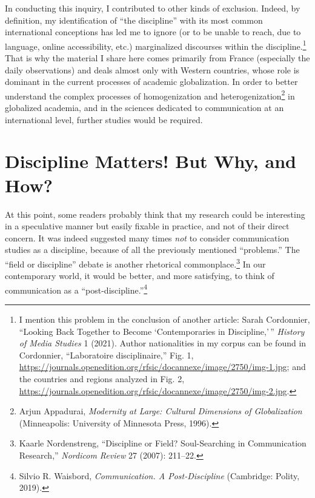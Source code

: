 \documentclass{tufte-handout}
\begin{document}
In conducting this inquiry, I contributed to other kinds of exclusion.
Indeed, by definition, my identification of ``the discipline'' with its
most common international conceptions has led me to ignore (or to be
unable to reach, due to language, online accessibility, etc.)
marginalized discourses within the discipline.\footnote{I mention this
  problem in the conclusion of another article: Sarah Cordonnier,
  ``Looking Back Together to Become `Contemporaries in Discipline,'\,''
  \emph{History of Media Studies} 1 (2021). Author nationalities in my
  corpus can be found in Cordonnier, ``Laboratoire disciplinaire,'' Fig.
  1,
  \url{https://journals.openedition.org/rfsic/docannexe/image/2750/img-1.jpg};
  and the countries and regions analyzed in Fig. 2,
  \url{https://journals.openedition.org/rfsic/docannexe/image/2750/img-2.jpg}.}
That is why the material I share here comes primarily from France
(especially the daily observations) and deals almost only with Western
countries, whose role is dominant in the current processes of academic
globalization. In order to better understand the complex processes of
homogenization and heterogenization\footnote{Arjun Appadurai,
  \emph{Modernity at Large: Cultural Dimensions of Globalization}
  (Minneapolis: University of Minnesota Press, 1996).} in globalized
academia, and in the sciences dedicated to communication at an
international level, further studies would be required.

\hypertarget{discipline-matters-but-why-and-how}{%
\section{Discipline Matters! But Why, and
How?}\label{discipline-matters-but-why-and-how}}

At this point, some readers probably think that my research could be
interesting in a speculative manner but easily fixable in practice, and
not of their direct concern. It was indeed suggested many times
\emph{not} to consider communication studies as a discipline, because of
all the previously mentioned ``problems.'' The ``field or discipline''
debate is another rhetorical commonplace.\footnote{Kaarle Nordenstreng,
  ``Discipline or Field? Soul-Searching in Communication Research,''
  \emph{Nordicom Review} 27 (2007): 211--22.} In our contemporary world,
it would be better, and more satisfying, to think of communication as a
``post-discipline.''\footnote{Silvio R. Waisbord, \emph{Communication. A
  Post-Discipline} (Cambridge: Polity, 2019).}
\end{document}
